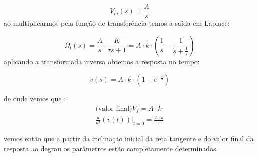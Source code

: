 \documentclass[a4paper,11pt]{article}
\begin{document}
\begin{equation}
  V_m(s) = \frac{A}{s}
\end{equation}
ao multiplicarmos pela função de transferência temos a saída em 
Laplace:

\begin{equation}
 \Omega _l(s) = \frac{A}{s} \cdot \frac{K}{\tau s + 1} = 
  A \cdot k \cdot (\frac{1}{s} - \frac{1}{s + \frac{1}{\tau}})
\end{equation}
aplicando a transformada inversa obtemos a resposta no tempo:

\begin{equation}
 v(s) = A \cdot k \cdot(1 - e^{-\frac{t}{\tau}})
\end{equation}

de onde vemos que :
\begin{equation}
  \begin{array}{l}
  \mbox{(valor final)} V_f = A \cdot k \\
  \frac{d}{dt}(v(t))|_{t = 0} = \frac{A \cdot k}{\tau}
  \end{array}
  \label{eq:leEq}
\end{equation}

vemos então que a partir da inclinação inicial da reta tangente e 
do valor final da resposta ao degrau os parâmetros estão 
completamente determinados.

\end{document}
